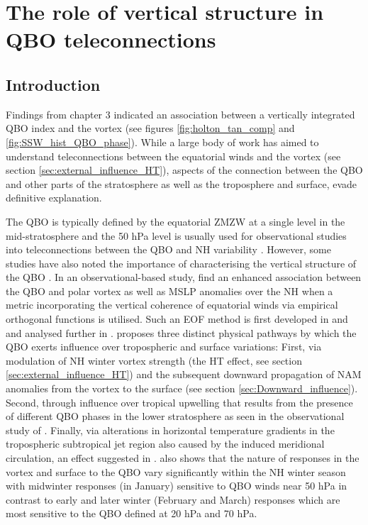 \chapter{The role of vertical structure in QBO teleconnections}
\label{cha:deepQBO}

\section{Introduction}
\label{sec:deepQBO-introduction}

Findings from chapter 3 indicated an association between a vertically integrated QBO index and the vortex (see figures \ref{fig:holton_tan_comp} and \ref{fig:SSW_hist_QBO_phase}). While a large body of work has aimed to understand teleconnections between the equatorial winds and the vortex (see section \ref{sec:external_influence_HT}), aspects of the connection between the QBO and other parts of the stratosphere as well as the troposphere and surface, evade definitive explanation.

The QBO is typically defined by the equatorial ZMZW at a single level in the mid-stratosphere and the 50 hPa level is usually used for observational studies into teleconnections between the QBO and NH variability \citep{baldwinQuasiBiennial2001}. However, some studies have also noted the importance of characterising the vertical structure of the QBO \citep{fraedrichEOF1993, wallaceRepresentation1993,  Baldwin98,  Dunkerton2017, graySurface2018b, andrewsObserved2019d}. In an observational-based study, \cite{graySurface2018b} find an enhanced association between the QBO and polar vortex as well as MSLP anomalies over the NH when a metric incorporating the vertical coherence of equatorial winds via empirical orthogonal functions is utilised. Such an EOF method is first developed in \cite{fraedrichEOF1993} and \cite{wallaceRepresentation1993} and analysed further in \cite{verena2016a}. \cite{graySurface2018b} proposes three distinct physical pathways by which the QBO exerts influence over tropospheric and surface variations: First, via modulation of NH winter vortex strength (the HT effect, see section \ref{sec:external_influence_HT}) and the subsequent downward propagation of NAM anomalies from the vortex to the surface (see section \ref{sec:Downward_influence}). Second, through influence over tropical upwelling that results from the presence of different QBO phases in the lower stratosphere as seen in the observational study of \cite{liessRelationship2012}. Finally, via alterations in horizontal temperature gradients in the tropospheric subtropical jet region also caused by the induced meridional circulation, an effect suggested in \cite{garfinkelInfluence2011}. \cite{graySurface2018b} also shows that the nature of responses in the vortex and surface to the QBO vary significantly within the NH winter season with midwinter responses (in January) sensitive to QBO winds near 50 hPa in contrast to early and later winter (February and March) responses which are most sensitive to the QBO defined at 20 hPa and 70 hPa. 

